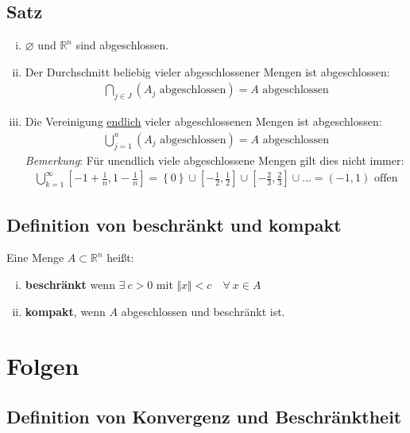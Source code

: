\documentclass[11pt,a4paper]{book}
\newcommand {\Rn}	{\mathbb{R}^n}
\newcommand{\1}    	{\mathbbm{1}}
\begin{document}
\subsection{Satz}
\begin{enumerate}[(i)]
	\item \(\varnothing\) und \(\Rn\) sind abgeschlossen.
	\item Der Durchschnitt beliebig vieler abgeschlossener Mengen ist abgeschlossen:
	\begin{align*}
		\bigcap_{j \in J} \left( A_j \textrm{ abgeschlossen} \right) = A \textrm{ abgeschlossen}
	\end{align*}
	\item Die Vereinigung \underline{endlich} vieler abgeschlossenen Mengen ist abgeschlossen:
	\begin{align*}
		\bigcup_{j = 1}^{n} \left( A_j \textrm{ abgeschlossen} \right) = A \textrm{ abgeschlossen}
	\end{align*}
	\textit{Bemerkung}: Für unendlich viele abgeschlossene Mengen gilt dies nicht immer:
	\begin{align*}
		\bigcup_{k = 1}^{\infty} \left[ -1 + \frac{1}{n}, 1 - \frac{1}{n} \right] = \left\{ 0 \right\} \cup \left[ -\frac{1}{2}, \frac{1}{2} \right] \cup \left[ -\frac{2}{3}, \frac{2}{3} \right] \cup ... = \left( -1, 1 \right) \textrm{ offen}
	\end{align*}	 
\end{enumerate}

\subsection{Definition von beschränkt und kompakt}
Eine Menge \(A \subset \Rn\) heißt:
\begin{enumerate}[(i)]
	\item \textbf{beschränkt} wenn \(\exists~ c > 0 \) mit \( \Vert x \Vert < c \quad \forall~ x \in A\)
	\item \textbf{kompakt}, wenn \(A\) abgeschlossen und beschränkt ist.
\end{enumerate}

\section{Folgen}

\subsection{Definition von Konvergenz und Beschränktheit}
\end{document}

